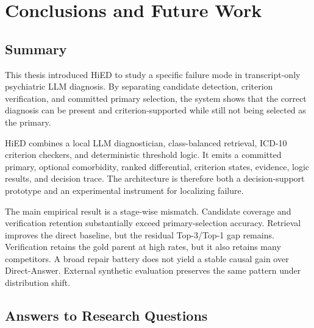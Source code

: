 \chapter{Conclusions and Future Work}
\label{ch:conclusion}

\section{Summary}

This thesis introduced HiED to study a specific failure mode in transcript-only psychiatric LLM diagnosis. By separating candidate detection, criterion verification, and committed primary selection, the system shows that the correct diagnosis can be present and criterion-supported while still not being selected as the primary.

HiED combines a local LLM diagnostician, class-balanced retrieval, ICD-10 criterion checkers, and deterministic threshold logic. It emits a committed primary, optional comorbidity, ranked differential, criterion states, evidence, logic results, and decision trace. The architecture is therefore both a decision-support prototype and an experimental instrument for localizing failure.

The main empirical result is a stage-wise mismatch. Candidate coverage and verification retention substantially exceed primary-selection accuracy. Retrieval improves the direct baseline, but the residual Top-3/Top-1 gap remains. Verification retains the gold parent at high rates, but it also retains many competitors. A broad repair battery does not yield a stable causal gain over Direct-Answer. External synthetic evaluation preserves the same pattern under distribution shift.

\section{Answers to Research Questions}


